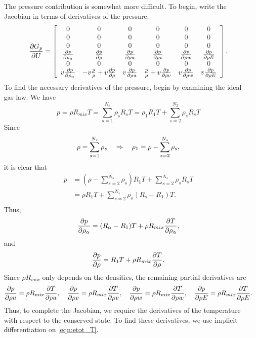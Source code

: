 %
The pressure contribution is somewhat more difficult.  To begin, write
the Jacobian in terms of derivatives of the pressure:
%
\begin{equation*}
\frac{\partial G_p}{\partial U} = \left[ \begin{array}{cccccc}
0 & 0 & 0 & 0 & 0 & 0 \\
0 & 0 & 0 & 0 & 0 & 0 \\
0 & 0 & 0 & 0 & 0 & 0 \\
\frac{\partial p}{\partial \rho_{\alpha}} & \frac{\partial p}{\partial \rho} & \frac{\partial p}{\partial \rho u} & \frac{\partial p}{\partial \rho v} & \frac{\partial p}{\partial \rho w} & \frac{\partial p}{\partial \rho E} \\
0 & 0 & 0 & 0 & 0 & 0 \\
v \frac{\partial p}{\partial \rho_{\alpha}} & -v \frac{p}{\rho} + v \frac{\partial p}{\partial \rho} & v \frac{\partial p}{\partial \rho u} & \frac{p}{\rho} + v \frac{\partial p}{\partial \rho v} & v \frac{\partial p}{\partial \rho w} & v \frac{\partial p}{\partial \rho E} \\
\end{array} \right].
\end{equation*}
%
To find the necessary derivatives of the pressure, begin by examining
the ideal gas law.  We have
%
\begin{equation*}
p = \rho R_{mix} T = \sum_{s=1}^{N_s} \rho_s R_s T = \rho_1 R_1 T + \sum_{s=2}^{N_2} \rho_s R_s T
\end{equation*}
%
Since
%
\begin{equation*}
\rho = \sum_{s=1}^{N_s} \rho_s \quad \Rightarrow \quad \rho_1 = \rho - \sum_{s=2}^{N_s} \rho_s,
\end{equation*}
%
it is clear that
%
\begin{align*}
p & = \left( \rho - \sum_{s=2}^{N_s} \rho_s \right) R_1 T + \sum_{s=2}^{N_s} \rho_s R_s T \\
& = \rho R_1 T + \sum_{s=2}^{N_s} \rho_s (R_s - R_1) T. \\
\end{align*}
%
Thus,
%
\begin{equation*}
\frac{\partial p}{\partial \rho_{\alpha}} = (R_{\alpha} - R_1) T + \rho R_{mix} \frac{\partial T}{\partial \rho_{\alpha}},
\end{equation*}
%
and
%
\begin{equation*}
\frac{\partial p}{\partial \rho} = R_1 T + \rho R_{mix} \frac{\partial T}{\partial \rho}.
\end{equation*}
%
Since $\rho R_{mix}$ only depends on the densities, the remaining
partial derivatives are
%
\begin{equation*}
\frac{\partial p}{\partial \rho u} = \rho R_{mix} \frac{\partial T}{\partial \rho u}, \quad
\frac{\partial p}{\partial \rho v} = \rho R_{mix} \frac{\partial T}{\partial \rho v}, \quad
\frac{\partial p}{\partial \rho w} = \rho R_{mix} \frac{\partial T}{\partial \rho w}, \quad
\frac{\partial p}{\partial \rho E} = \rho R_{mix} \frac{\partial T}{\partial \rho E}.
\end{equation*}
%
Thus, to complete the Jacobian, we require the derivatives of the
temperature with respect to the conserved state.  To find these
derivatives, we use implicit differentiation on \eqref{eqn:etot_T}.

